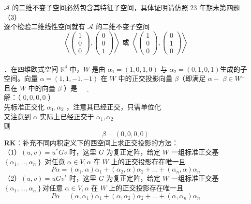 \documentclass[UTF8]{ctexart}
\begin{document}
$\mathcal{A}$ 的二维不变子空间必然包含其特征子空间，具体证明请仿照 23 年期末第四题（3）\\
逐个检验二维线性空间就有 $\mathcal{A}$ 的二维不变子空间
$$
\left\langle\left(\begin{array}{l}
	1 \\
	0 \\
	0
\end{array}\right),\left(\begin{array}{l}
	0 \\
	0 \\
	1
\end{array}\right)\right\rangle \text { 或 }\left\langle\left(\begin{array}{l}
	1 \\
	0 \\
	0
\end{array}\right),\left(\begin{array}{l}
	0 \\
	1 \\
	0
\end{array}\right)\right\rangle
$$\\



．在四维欧式空间 $\mathbb{R}^{4}$ 中，$W$ 是由 $\alpha_{1}=(1,0,1,0)$ 与 $\alpha_{2}=(0,1,0,1)$生成的子空间。向量 $\alpha=(1,1,-1,-1)$ 在 $W$ 中的正交投影向量 $\beta$（即满足 $\alpha-$ $\beta \in W^{\perp}$ 且在 $W$ 中的向量 $\beta$ ）是 $\underline{\hspace{1cm}}$\\
解：（ $0,0,0,0$ ）\\
先标准正交化 $\alpha_{1}, \alpha_{2}$ ，注意其已经正交，只需单位化\\
又注意到 $\alpha$ 实际上已经正交于 $\alpha_{1}, \alpha_{2}$\\
则 
$$\beta=(0,0,0,0)$$
\textbf{RK}：补充不同内积定义下的西空间上求正交投影的方法：\\
（1）$(u, v)=u^{*} G v$ 时，这里 $G$ 为复正定阵，给定 $W$ 一组标准正交基 $\left\{\alpha_{1}, \ldots, \alpha_{n}\right\}$
对任意 $\alpha \in V, \alpha$ 在 $W$ 上的正交投影存在唯一且 
$$P \alpha=\left(\alpha_{1}, \alpha\right) \alpha_{1}+\left(\alpha_{2}, \alpha\right) \alpha_{2}+\ldots+\left(\alpha_{n}, \alpha\right) \alpha_{n}$$
（2）$(u, v)=u G v^{*}$ 时，这里 $G$ 为复正定阵，给定 $W$ 一组标准正交基 $\left\{\alpha_{1}, \ldots, \alpha_{n}\right\}$对任意 $\alpha \in V, \alpha$ 在 $W$ 上的正交投影存在唯一且 
$$P \alpha=\left(\alpha, \alpha_{1}\right) \alpha_{1}+\left(\alpha, \alpha_{2}\right) \alpha_{2}+\ldots+\left(\alpha, \alpha_{n}\right) \alpha_{n}$$\\
\end{document}
